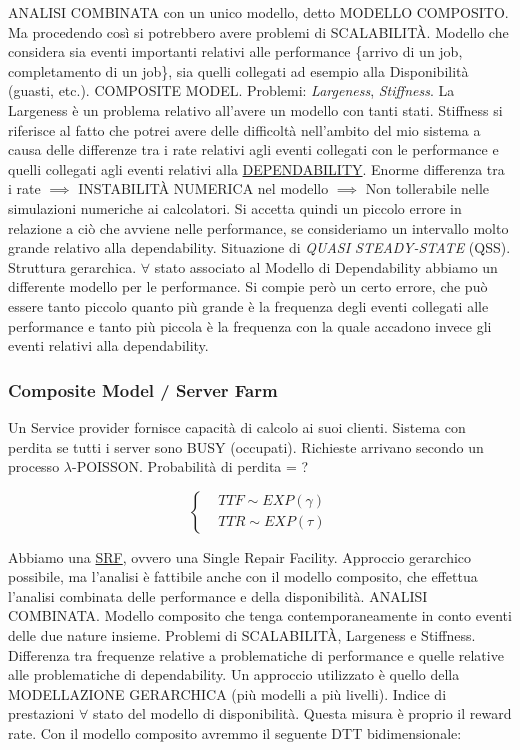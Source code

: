 ANALISI COMBINATA con un unico modello, detto MODELLO COMPOSITO. Ma procedendo così si potrebbero avere problemi di SCALABILIT\`A. Modello che considera sia eventi importanti relativi alle performance \{arrivo di un job, completamento di un job\}, sia quelli collegati ad esempio alla Disponibilità (guasti, etc.). COMPOSITE MODEL. Problemi: \textit{Largeness}, \textit{Stiffness}. La Largeness è un problema relativo all'avere un modello con tanti stati. Stiffness si riferisce al fatto che potrei avere delle difficoltà nell'ambito del mio sistema a causa delle differenze tra i rate relativi agli eventi collegati con le performance e quelli collegati agli eventi relativi alla \underline{DEPENDABILITY}. Enorme differenza tra i rate $\implies$ INSTABILIT\`A NUMERICA nel modello $\implies$ Non tollerabile nelle simulazioni numeriche ai calcolatori. Si accetta quindi un piccolo errore in relazione a ciò che avviene nelle performance, se consideriamo un intervallo molto grande relativo alla dependability. Situazione di \textit{QUASI STEADY-STATE} (QSS). Struttura gerarchica. $\forall$ stato associato al Modello di Dependability abbiamo un differente modello per le performance. Si compie però un certo errore, che può essere tanto piccolo quanto più grande è la frequenza degli eventi collegati alle performance e tanto più piccola è la frequenza con la quale accadono invece gli eventi relativi alla dependability.

\subsubsection{Composite Model / Server Farm}

Un Service provider fornisce capacità di calcolo ai suoi clienti. Sistema con perdita se tutti i server sono BUSY (occupati). Richieste arrivano secondo un processo $\lambda$-POISSON. Probabilità di perdita = ?

\[
	\left\{
	\begin{aligned}
	&TTF \sim EXP(\gamma)\\
	&TTR \sim EXP(\tau)
	\end{aligned}
	\right.
\]

Abbiamo una \underline{SRF}, ovvero una Single Repair Facility. Approccio gerarchico possibile, ma l'analisi è fattibile anche con il modello composito, che effettua l'analisi combinata delle performance e della disponibilità. ANALISI COMBINATA. Modello composito che tenga contemporaneamente in conto eventi delle due nature insieme. Problemi di SCALABILIT\`A, Largeness e Stiffness. Differenza tra frequenze relative a problematiche di performance e quelle relative alle problematiche di dependability. Un approccio utilizzato è quello della MODELLAZIONE GERARCHICA (più modelli a più livelli). Indice di prestazioni $\forall$ stato del modello di disponibilità. Questa misura è proprio il reward rate. Con il modello composito avremmo il seguente DTT bidimensionale:

